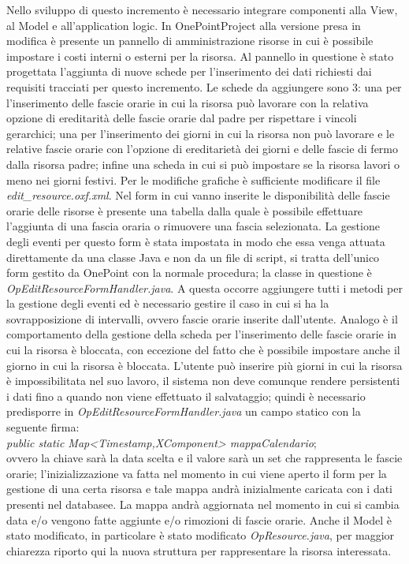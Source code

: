 Nello sviluppo di questo incremento \`{e} necessario integrare componenti alla View, al Model e all\textquoteright{}application logic.
In OnePointProject alla versione presa in modifica \`{e} presente un pannello di amministrazione risorse in cui \`{e} possibile impostare i costi interni o esterni per la risorsa. Al pannello in questione \`{e} stato progettata l\textquoteright{}aggiunta di nuove schede per l\textquoteright{}inserimento dei dati richiesti dai requisiti tracciati per questo incremento. Le schede da aggiungere sono 3: una per l\textquoteright{}inserimento delle fascie orarie in cui la risorsa pu\`{o} lavorare con la relativa opzione di ereditarit\`{a} delle fascie orarie dal padre per rispettare i vincoli gerarchici; una per l\textquoteright{}inserimento dei giorni in cui la risorsa non pu\`{o} lavorare e le relative fascie orarie con l\textquoteright{}opzione di ereditariet\`{a} dei giorni e delle fascie di fermo dalla risorsa padre; infine una scheda in cui si pu\`{o} impostare se la risorsa lavori o meno nei giorni festivi. Per le modifiche grafiche \`{e} sufficiente modificare il file \textit{edit\_resource.oxf.xml}.
Nel form in cui vanno inserite le disponibilit\`{a} delle fascie orarie delle risorse \`{e} presente una tabella dalla quale \`{e} possibile effettuare l\textquoteright{}aggiunta di una fascia oraria o rimuovere una fascia selezionata. La gestione degli eventi per questo form \`{e} stata impostata in modo che essa venga attuata direttamente da una classe Java e non da un file di script, si tratta dell\textquoteright{}unico form gestito da OnePoint con la normale procedura; la classe in questione \`{e} \textit{OpEditResourceFormHandler.java}. A questa occorre aggiungere tutti i metodi per la gestione degli eventi ed \`{e} necessario gestire il caso in cui si ha la sovrapposizione di intervalli, ovvero fascie orarie inserite dall\textquoteright{}utente. Analogo \`{e} il comportamento della gestione della scheda per l\textquoteright{}inserimento delle fascie orarie in cui la risorsa \`{e} bloccata, con eccezione del fatto che \`{e} possibile impostare anche il giorno in cui la risorsa \`{e} bloccata. L\textquoteright{}utente pu\`{o} inserire pi\`{u} giorni in cui la risorsa \`{e} impossibilitata nel suo lavoro, il sistema non deve comunque rendere persistenti i dati fino a quando non viene effettuato il salvataggio; quindi \`{e} necessario predisporre in \textit{OpEditResourceFormHandler.java} un campo statico con la seguente firma:\\ \textit{public static Map<Timestamp,XComponent> mappaCalendario}; \\ ovvero la chiave sar\`{a} la data scelta e il valore sar\`{a} un set che rappresenta le fascie orarie; l\textquoteright{}inizializzazione va fatta nel momento in cui viene aperto il form per la gestione di una certa risorsa e tale mappa andr\`{a} inizialmente caricata con i dati presenti nel databasee. La mappa andr\`{a} aggiornata nel momento in cui si cambia data e/o vengono fatte aggiunte e/o rimozioni di fascie orarie. Anche il Model \`{e} stato modificato, in particolare \`{e} stato modificato \textit{OpResource.java}, per maggior chiarezza riporto qui la nuova struttura per rappresentare la risorsa interessata.

